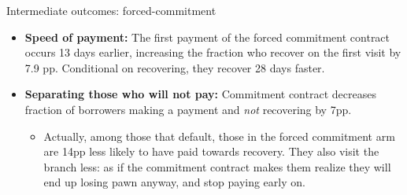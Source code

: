 \documentclass[8pt]{beamer}
\begin{document}
\begin{frame}{Intermediate outcomes: forced-commitment}
\label{intermediate_outcomes}
 \begin{itemize}
     \item \vfill \textbf{Speed of payment:} The first payment of the forced commitment contract  occurs 13 days earlier, increasing the fraction who recover on the first visit by 7.9 pp. Conditional on recovering, they recover 28 days faster.
     
    \item \vfill \textbf{Separating those who will not pay:} Commitment contract decreases fraction of borrowers making a payment and \textit{not} recovering by 7pp.
    \begin{itemize}
        \item Actually, among those that default, those in the forced commitment arm are 14pp less likely to have paid towards recovery. They also visit the branch less: as if the commitment contract makes them realize they will end up losing pawn anyway, and stop paying early on.
    \end{itemize}
    \end{itemize}

   \vfill
   
   \hyperlink{mechanism_appendix}{}
\end{frame}
\end{document}
